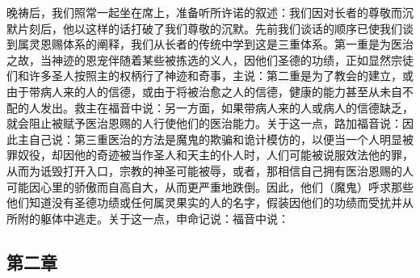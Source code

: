 晚祷后，我们照常一起坐在席上，准备听所许诺的叙述：我们因对长者的尊敬而沉默片刻后，他以这样的话打破了我们尊敬的沉默。先前我们谈话的顺序已使我们谈到属灵恩赐体系的阐释，我们从长者的传统中学到这是三重体系。第一重是为医治之故，当神迹的恩宠伴随着某些被拣选的义人，因他们圣德的功绩，正如显然宗徒们和许多圣人按照主的权柄行了神迹和奇事，主说：第二重是为了教会的建立，或由于带病人来的人的信德，或由于将被治愈之人的信德，健康的能力甚至从未自不配的人发出。救主在福音中说：另一方面，如果带病人来的人或病人的信德缺乏，就会阻止被赋予医治恩赐的人行使他们的医治能力。关于这一点，路加福音说：因此主自己说：第三重医治的方法是魔鬼的欺骗和诡计模仿的，以便当一个人明显被罪奴役，却因他的奇迹被当作圣人和天主的仆人时，人们可能被说服效法他的罪，从而为诋毁打开入口，宗教的神圣可能被辱，或者，那相信自己拥有医治恩赐的人可能因心里的骄傲而自高自大，从而更严重地跌倒。因此，他们（魔鬼）呼求那些他们知道没有圣德功绩或任何属灵果实的人的名字，假装因他们的功绩而受扰并从所附的躯体中逃走。关于这一点，申命记说：福音中说：\par


\subsection{第二章}

\par

